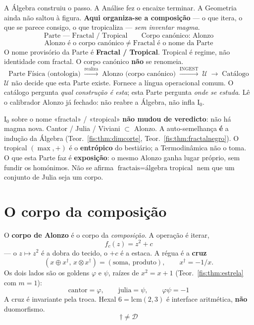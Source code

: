 \documentclass[livro.tex]{subfiles}
\begin{document}
\noindent A Álgebra construiu o passo. A Análise fez o encaixe terminar.
A Geometria ainda não saltou à figura. \textbf{Aqui organiza-se a composição}
--- o que itera, o que se parece consigo, o que tropicaliza ---
\emph{sem inventar magma}.
\[
\boxed{\;
\text{Parte --- Fractal / Tropical}
\qquad
\text{Corpo canónico: Alonzo}
\;}
\]
\[
\boxed{\;
\text{Alonzo é o corpo canónico}
\;\neq\;
\text{Fractal é o nome da Parte}
\;}
\]
O nome provisório da Parte é \textbf{Fractal / Tropical}. Tropical é
regime, não identidade com fractal. O corpo canónico \textbf{não} se
renomeia.
\[
\boxed{\;
\text{Parte Física (ontologia)}
\;\xrightarrow{\text{realiza}}\;
\text{Alonzo (corpo canónico)}
\;\xrightarrow{\operatorname{INGEST}}\;
\mathcal{U}
\;\longrightarrow\;
\text{Catálogo}
\;}
\]
\(\mathcal{U}\) não decide que esta Parte existe. Fornece a língua
operacional comum. O catálogo pergunta \emph{qual construção é esta};
esta Parte pergunta \emph{onde se estuda}. Lê o calibrador Alonzo já
fechado: não reabre a Álgebra, não infla \(\mathrm{I}_{0}\).

\begin{observacao}\label{fis:obs:fractal-i0}
\(\mathrm{I}_{0}\) sobre o nome «fractal» / «tropical» \textbf{não mudou de
veredicto}: não há magma nova. Cantor / Julia / Viviani \(\subset\) Alonzo.
A auto-semelhança \textbf{é} a indução da Álgebra (Teor.~\ref{fis:thm:dimcorte},
Teor.~\ref{fis:thm:fractalnegro}). O tropical \((\max,+)\) é o
\textbf{entrópico} do bestiário; a Termodinâmica não o toma.
O que esta Parte faz é \textbf{exposição}: o mesmo Alonzo ganha lugar
próprio, sem fundir os homónimos.
Não se afirma \(\text{fractais}=\text{álgebra tropical}\) nem que um
conjunto de Julia seja um corpo.
\end{observacao}

\section{O corpo da composição}\label{fis:alonzo-corpo}

\begin{definicao}\label{fis:def:alonzo}
O \textbf{corpo de Alonzo} é o corpo da \emph{composição}. A operação é
iterar,
\[
\boxed{\;f_c(z)=z^{2}+c\;}
\]
--- o \(z\mapsto z^{2}\) é a dobra do tecido, o \(+c\) é a estaca. A
régua é a \textbf{cruz}
\[
(x\oplus x^{\dagger},\,x\otimes x^{\dagger})=(\text{soma},\,\text{produto}),
\qquad
x^{\dagger}=-1/x.
\]
Os dois lados são os goldens \(\varphi\) e \(\psi\), raízes de
\(x^{2}=x+1\) (Teor.~\ref{fis:thm:estrela} com \(m=1\)):
\[
\boxed{\;\text{cantor}=\varphi,\qquad\text{julia}=\psi,\qquad\varphi\psi=-1\;}
\]
A cruz é invariante pela troca. Hexal \(6=\mathrm{lcm}(2,3)\) é
interface aritmética, \textbf{não} duomorfismo.
\[
\boxed{\;\dagger\neq\mathcal{D}\;}
\]
\end{definicao}
\end{document}
